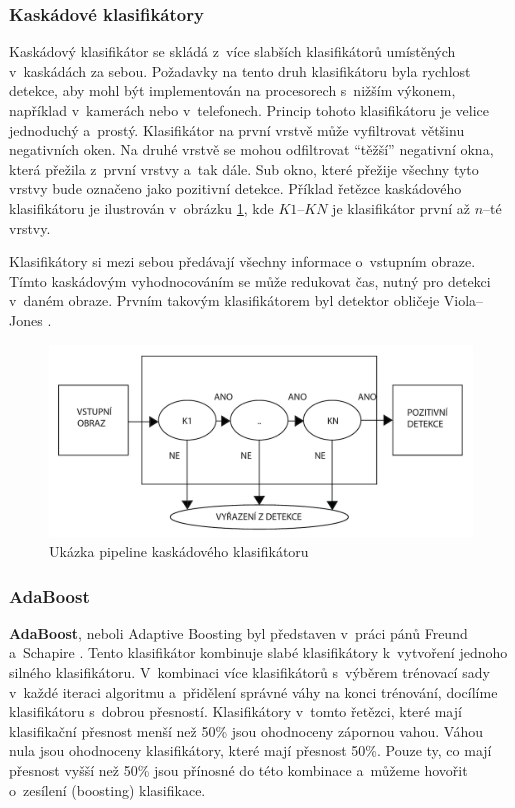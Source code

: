\subsubsection*{Kaskádové klasifikátory} %
Kaskádový klasifikátor se skládá z~více slabších klasifikátorů umístěných v~kaskádách za sebou. Požadavky na tento druh klasifikátoru byla rychlost detekce, aby mohl být implementován na procesorech s~nižším výkonem, například v~kamerách nebo v~telefonech. Princip tohoto klasifikátoru je velice jednoduchý a~prostý. Klasifikátor na první vrstvě může vyfiltrovat většinu negativních oken. Na druhé vrstvě se mohou odfiltrovat ``těžší'' negativní okna, která přežila z~první vrstvy a~tak dále. Sub okno, které přežije všechny tyto vrstvy bude označeno jako pozitivní detekce. Příklad řetězce kaskádového klasifikátoru je ilustrován v~obrázku \ref{fig:ccpipeline}, kde $K1$--$KN$ je klasifikátor první až $n$--té vrstvy.

Klasifikátory si mezi sebou předávají všechny informace o~vstupním obraze. Tímto kaskádovým vyhodnocováním se může redukovat čas, nutný pro detekci v~daném obraze. Prvním takovým klasifikátorem byl detektor obličeje Viola--Jones \cite{violajones}.  
\begin{figure}[H]
\centering
\includegraphics[width=.8\linewidth]{figures/cascadeClass.pdf}
\caption{Ukázka pipeline kaskádového klasifikátoru}
\label{fig:ccpipeline}
\end{figure}

\subsubsection*{AdaBoost}
\textbf{AdaBoost}, neboli Adaptive Boosting byl představen v~práci pánů Freund a~Schapire \cite{adaboost}. Tento klasifikátor kombinuje slabé klasifikátory k~vytvoření jednoho silného klasifikátoru. V~kombinaci více klasifikátorů s~výběrem trénovací sady v~každé iteraci algoritmu a~přidělení správné váhy na konci trénování, docílíme klasifikátoru s~dobrou přesností. Klasifikátory v~tomto řetězci, které mají klasifikační přesnost menší než 50\% jsou ohodnoceny zápornou vahou. Váhou nula jsou ohodnoceny klasifikátory, které mají přesnost 50\%. Pouze ty, co mají přesnost vyšší než 50\% jsou přínosné do této kombinace a~můžeme hovořit o~zesílení (boosting) klasifikace. 

